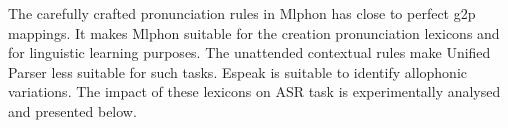 \documentclass{ieeeaccess}
\begin{document}
The carefully crafted pronunciation rules in Mlphon has close to perfect g2p mappings. It makes Mlphon suitable for the creation pronunciation lexicons and for linguistic learning purposes. The unattended contextual rules make Unified Parser less suitable for such tasks. Espeak is suitable to identify allophonic variations. The impact of these lexicons on ASR task is experimentally analysed and presented below.





%



\end{document}
